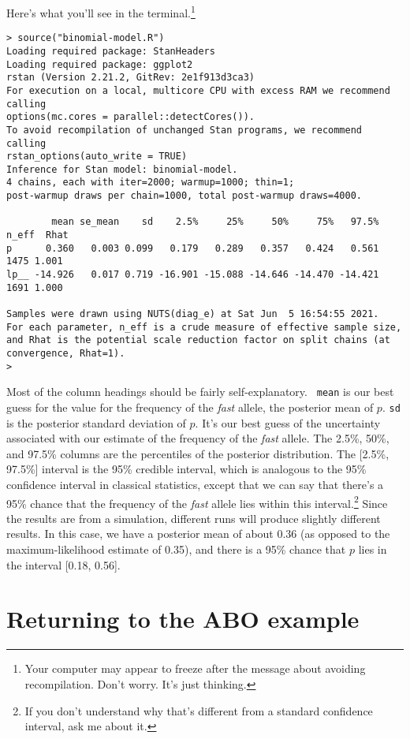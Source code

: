 \documentclass[12pt]{article}
\begin{document}
\noindent Here's what you'll see in the terminal.\footnote{Your
  computer may appear to freeze after the message about avoiding
  recompilation. Don't worry. It's just thinking.}

\begin{verbatim}
> source("binomial-model.R")
Loading required package: StanHeaders
Loading required package: ggplot2
rstan (Version 2.21.2, GitRev: 2e1f913d3ca3)
For execution on a local, multicore CPU with excess RAM we recommend calling
options(mc.cores = parallel::detectCores()).
To avoid recompilation of unchanged Stan programs, we recommend calling
rstan_options(auto_write = TRUE)
Inference for Stan model: binomial-model.
4 chains, each with iter=2000; warmup=1000; thin=1; 
post-warmup draws per chain=1000, total post-warmup draws=4000.

        mean se_mean    sd    2.5%     25%     50%     75%   97.5% n_eff  Rhat
p      0.360   0.003 0.099   0.179   0.289   0.357   0.424   0.561  1475 1.001
lp__ -14.926   0.017 0.719 -16.901 -15.088 -14.646 -14.470 -14.421  1691 1.000

Samples were drawn using NUTS(diag_e) at Sat Jun  5 16:54:55 2021.
For each parameter, n_eff is a crude measure of effective sample size,
and Rhat is the potential scale reduction factor on split chains (at 
convergence, Rhat=1).
>
\end{verbatim}

Most of the column headings should be fairly self-explanatory. {\tt
  mean} is our best guess for the value for the frequency of the {\it
  fast\/} allele, the posterior mean of $p$. {\tt sd} is the posterior
standard deviation of $p$. It's our best guess of the uncertainty
associated with our estimate of the frequency of the {\it fast\/}
allele. The 2.5\%, 50\%, and 97.5\% columns are the percentiles of the
posterior distribution. The [2.5\%, 97.5\%] interval is the 95\%
credible interval, which is analogous to the 95\% confidence interval
in classical statistics, except that we can say that there's a 95\%
chance that the frequency of the {\it fast\/} allele lies within this
interval.\footnote{If you don't understand why that's different from a
  standard confidence interval, ask me about it.} Since the results
are from a simulation, different runs will produce slightly different
results. In this case, we have a posterior mean of about 0.36 (as
opposed to the maximum-likelihood estimate of 0.35), and there is a
95\% chance that $p$ lies in the interval [0.18, 0.56].

\section*{Returning to the ABO example}
\end{document}
